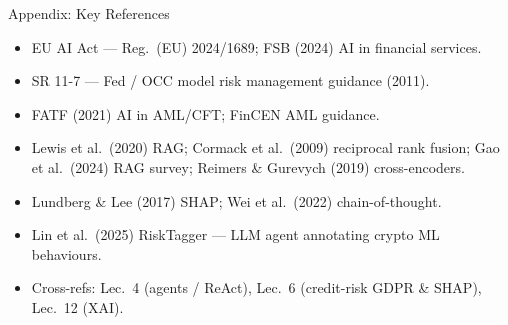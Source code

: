 \documentclass[9pt,t]{beamer}
\begin{document}
\begin{frame}[noframenumbering]{Appendix: Key References}
\footnotesize
\begin{itemize}
  \item EU AI Act --- Reg.\ (EU) 2024/1689; FSB (2024) AI in financial services.
  \item SR 11-7 --- Fed / OCC model risk management guidance (2011).
  \item FATF (2021) AI in AML/CFT; FinCEN AML guidance.
  \item Lewis et al.\ (2020) RAG; Cormack et al.\ (2009) reciprocal rank fusion;
        Gao et al.\ (2024) RAG survey; Reimers \& Gurevych (2019) cross-encoders.
  \item Lundberg \& Lee (2017) SHAP; Wei et al.\ (2022) chain-of-thought.
  \item Lin et al.\ (2025) RiskTagger --- LLM agent annotating crypto ML behaviours.
  \item Cross-refs: Lec.\ 4 (agents / ReAct), Lec.\ 6 (credit-risk GDPR \& SHAP),
        Lec.\ 12 (XAI).
\end{itemize}
\end{frame}
\end{document}
